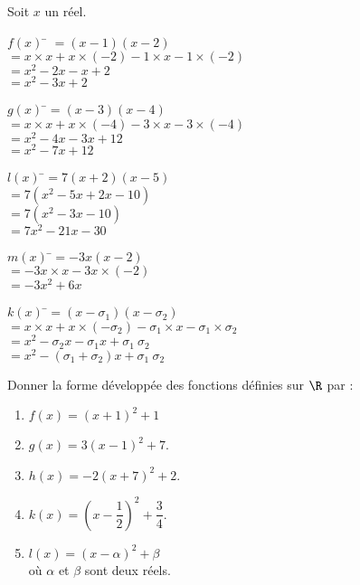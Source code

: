\documentclass[a4paper,11pt,exos]{nsi} %
\begin{document}
\begin{multicols}{2}
    Soit $x$ un réel.
    \begin{tabbing}
        $f(x)$  \= $=(x-1)(x-2)$\\
        \>  $=x\times x+x\times (-2)-1\times x-1\times (-2)$\\
        \>  $=x^2-2x-x+2$\\
        \>  $=x^2-3x+2$
    \end{tabbing}
    
    \begin{tabbing}
        $g(x)$  \=$=(x-3)(x-4)$\\
        \>  $=x\times x+x\times (-4)-3\times x-3\times (-4)$\\
        \>  $=x^2-4x-3x+12$\\
        \>  $=x^2-7x+12$
    \end{tabbing}

    \vfill\null \columnbreak
    \begin{tabbing}
        $l(x)$  \=$=7(x+2)(x-5)$\\
        \>  $=7\left(x^2-5x+2x-10\right)$\\
        \>  $=7\left(x^2-3x-10\right)$\\
        \>  $=7x^2-21x-30$
    \end{tabbing}

    \begin{tabbing}
        $m(x)$ \=$=-3x(x-2)$\\
        \>  $=-3x\times x-3x\times (-2)$\\
        \>  $=-3x^2+6x$
    \end{tabbing}

    \begin{tabbing}
        $k(x)$  \=$=(x-\sigma_1)(x-\sigma_2)$\\
        \>  $=x\times x +x\times (-\sigma_2)-\sigma_1\times x-\sigma_1\times\sigma_2$\\
        \>  $=x^2-\sigma_2 x-\sigma_1 x+\sigma_1\ \sigma_2$\\
        \>  $=x^2-\left(\sigma_1+\sigma_2\right)x+ \sigma_1\ \sigma_2$
    \end{tabbing}
\end{multicols}

\exo{}
\textcolor{UGLiBlue}{
Donner la forme développée des fonctions définies sur $\R$ par :
\begin{multicols}{3}
	\begin{enumerate}[label=\textbullet]
		\item 	$f(x)=(x+1)^2+1$
		\item 	$g(x)=3(x-1)^2+7$.
		\item 	$h(x)=-2(x+7)^2+2$.
		\item 	$k(x)=\left(x-\dfrac{1}{2}\right)^2+\dfrac{3}{4}$.
		\item	$l(x)=(x-\alpha)^2+\beta$\\ où $\alpha$ et $\beta$ sont deux réels.
	\end{enumerate}
\end{multicols}}
\end{document}
